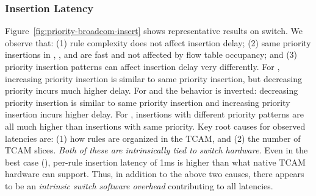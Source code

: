 \subsubsection{Insertion Latency}
\label{s:meas_insert}

Figure~\ref{fig:priority-broadcom-insert} shows representative results on \BroadcomOne switch.
We observe that: (1) rule complexity does not affect insertion delay; (2)
same priority insertions in \BroadcomOne, \BroadcomThree, \Intel and \IBM are fast
and not affected by flow table occupancy; and (3) priority insertion patterns
can affect insertion delay very differently. For \Intel, increasing priority
insertion is similar to same priority insertion, but decreasing priority 
incurs much higher delay. For \BroadcomThree and \IBM the behavior is inverted:  
decreasing priority insertion is similar to same priority insertion and increasing priority insertion incurs higher delay. For \BroadcomOne, 
insertions with different priority patterns are all much higher than
insertions with same priority. 
Key root causes for observed latencies are: (1) how rules are organized in the TCAM, and (2) the number of TCAM slices. {\em Both of these are intrinsically tied to switch hardware.} Even in the best case (\Intel), per-rule insertion latency of 1ms is higher than what native TCAM hardware can support. Thus, in addition to the above two causes, there appears to be an {\em intrinsic switch software overhead} contributing to all latencies.


